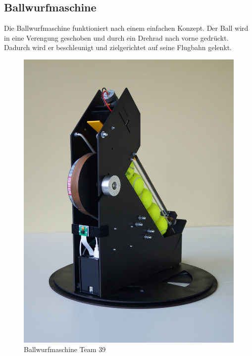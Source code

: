 \subsection{Ballwurfmaschine}
Die Ballwurfmaschine funktioniert nach einem einfachen Konzept. Der Ball wird in eine Verengung geschoben und durch ein Drehrad nach vorne gedrückt. Dadurch wird er beschleunigt und zielgerichtet auf seine Flugbahn gelenkt.

\begin{figure}[h!]
\centering
\includegraphics[width=0.7\linewidth]{../../fig/DSC08832xx}
\caption{Ballwurfmaschine Team 39}
\label{fig:ballwurfmaschine}
\end{figure}
